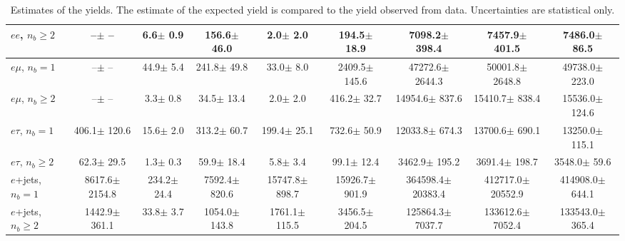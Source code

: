 \begin{sidewaystable}[p]
\begin{tabular}{l|cccccc|cc}
    $e e$, $n_b\geq2$                  &       --$\pm$     -- &      6.6$\pm$    0.9 &    156.6$\pm$   46.0 &      2.0$\pm$    2.0 &    194.5$\pm$   18.9 &   7098.2$\pm$  398.4 &   7457.9$\pm$  401.5 &   7486.0$\pm$   86.5 \\ 
    \hline
    $e\mu$, $n_b=1$                    &       --$\pm$     -- &     44.9$\pm$    5.4 &    241.8$\pm$   49.8 &     33.0$\pm$    8.0 &   2409.5$\pm$  145.6 &  47272.6$\pm$ 2644.3 &  50001.8$\pm$ 2648.8 &  49738.0$\pm$  223.0 \\ 
    $e\mu$, $n_b\geq2$                 &       --$\pm$     -- &      3.3$\pm$    0.8 &     34.5$\pm$   13.4 &      2.0$\pm$    2.0 &    416.2$\pm$   32.7 &  14954.6$\pm$  837.6 &  15410.7$\pm$  838.4 &  15536.0$\pm$  124.6 \\ 
    \hline
    $e\tau$, $n_b=1$                   &    406.1$\pm$  120.6 &     15.6$\pm$    2.0 &    313.2$\pm$   60.7 &    199.4$\pm$   25.1 &    732.6$\pm$   50.9 &  12033.8$\pm$  674.3 &  13700.6$\pm$  690.1 &  13250.0$\pm$  115.1 \\ 
    $e\tau$, $n_b\geq2$                &     62.3$\pm$   29.5 &      1.3$\pm$    0.3 &     59.9$\pm$   18.4 &      5.8$\pm$    3.4 &     99.1$\pm$   12.4 &   3462.9$\pm$  195.2 &   3691.4$\pm$  198.7 &   3548.0$\pm$   59.6 \\ 
    \hline
    $e$+jets, $n_b=1$                  &   8617.6$\pm$ 2154.8 &    234.2$\pm$   24.4 &   7592.4$\pm$  820.6 &  15747.8$\pm$  898.7 &  15926.7$\pm$  901.9 & 364598.4$\pm$20383.4 & 412717.0$\pm$20552.9 & 414908.0$\pm$  644.1 \\ 
    $e$+jets, $n_b\geq2$               &   1442.9$\pm$  361.1 &     33.8$\pm$    3.7 &   1054.0$\pm$  143.8 &   1761.1$\pm$  115.5 &   3456.5$\pm$  204.5 & 125864.3$\pm$ 7037.7 & 133612.6$\pm$ 7052.4 & 133543.0$\pm$  365.4 \\ 
    \hline

    \end{tabular}
    \caption{Estimates of the yields. The estimate of the expected yield is compared to
    the yield observed from data.  Uncertainties are statistical only.
    \label{tab:yields}}
\end{sidewaystable}
